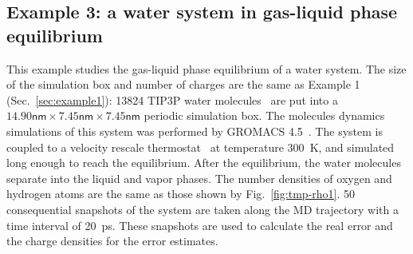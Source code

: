\documentclass[aps,pre,preprint]{revtex4}
\begin{document}



\subsection{Example 3: a water system in gas-liquid phase equilibrium}
\label{sec:example3}

This example studies the gas-liquid phase equilibrium of a water
system. The size of the simulation box and number of charges are the
same as Example 1 (Sec.~\ref{sec:example1}): 13824 TIP3P water
molecules~\cite{jorgensen1983comparison} are put into a
$14.90\textsf{nm}\times 7.45\textsf{nm}\times 7.45\textsf{nm}$
periodic simulation box.  The molecules dynamics simulations of this
system was performed by GROMACS 4.5~\cite{hess2008gromacs}.  The system
is coupled to a velocity rescale thermostat~\cite{bussi2007canonical}
at temperature 300~\textsf{K}, and simulated long enough to reach the
equilibrium. After the equilibrium,
the water molecules separate into the liquid and vapor phases.
The number densities of oxygen and hydrogen atoms
are the same as those shown by Fig.~\ref{fig:tmp-rho1}.
50 consequential snapshots of
the system are taken along the MD trajectory
with a time interval of 20~\textsf{ps}.  These
snapshots are used to calculate the real error and the charge densities
for the error estimates.
\end{document}
